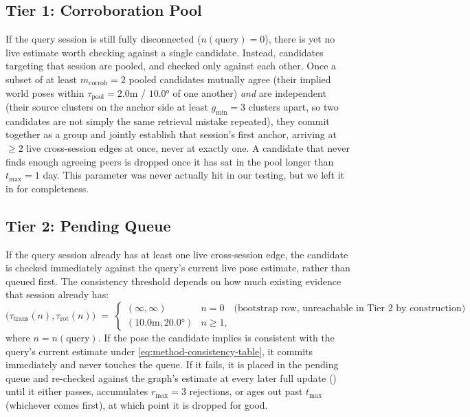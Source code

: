 \subsection{Tier 1: Corroboration Pool}

If the query session is still fully disconnected ($n(\text{query}) = 0$), there is yet no live
estimate worth checking against a single candidate. Instead, candidates targeting that
session are pooled, and checked only against each other. Once a subset of at least
$m_{\mathrm{corrob}} = 2$ pooled candidates mutually agree (their implied world poses within
$\tau_{\mathrm{pool}} = 2.0$m / $10.0°$ of one another) \emph{and} are independent (their
source clusters on the anchor side at least $g_{\min} = 3$ clusters apart, so two candidates
are not simply the same retrieval mistake repeated), they commit together as a group and
jointly establish that session's first anchor, arriving at $\ge 2$ live cross-session edges at
once, never at exactly one. A candidate that never finds enough agreeing peers is dropped once
it has sat in the pool longer than $t_{\max} = 1$ day. This parameter was never actually hit in our testing, but we left it in for completeness.

\subsection{Tier 2: Pending Queue}

If the query session already has at least one live cross-session edge, the candidate is
checked immediately against the query's current live pose estimate, rather than queued first.
The consistency threshold depends on how much existing evidence that session already has:
\begin{equation}
  \label{eq:method-consistency-table}
  \big(\tau_{\mathrm{trans}}(n), \tau_{\mathrm{rot}}(n)\big) \;=\;
  \begin{cases}
    (\infty, \infty) & n = 0 \quad\text{(bootstrap row, unreachable in Tier 2 by
      construction)} \\
    (10.0\text{m}, 20.0°) & n \ge 1,
  \end{cases}
\end{equation}
where $n = n(\text{query})$. If the pose the candidate implies is consistent with the query's
current estimate under \eqref{eq:method-consistency-table}, it commits immediately and never
touches the queue. If it fails, it is placed in the pending queue and re-checked against the
graph's estimate at every later full update () until it either
passes, accumulates $r_{\max} = 3$ rejections, or ages out past $t_{\max}$ (whichever comes
first), at which point it is dropped for good.

